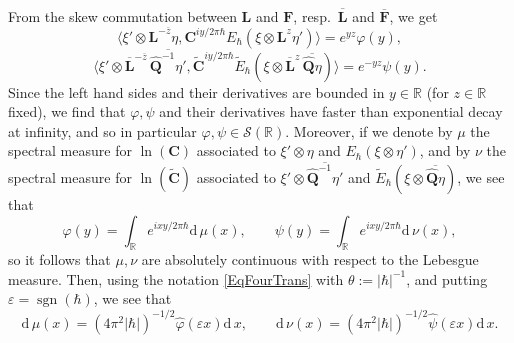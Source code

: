 \documentclass[11pt, reqno]{amsart}
\theoremstyle{definition}
\numberwithin{equation}{section}
\def\R{\mathbb R}
\def\sgn{\operatorname{sgn}}
\def\Sc{\mathcal S}
\newcommand{\Qb}{\mathbf{Q}}
\newcommand{\rd}{\mathrm{d}\!\,}
\newcommand{\Fb}{\mathbf{F}}
\newcommand{\Lb}{\mathbf{L}}
\newcommand{\Cb}{\mathbf{C}}
\begin{document}
From the skew commutation between $\Lb$ and $\Fb$, resp.\ $\overline{\Lb}$ and $\overline{\Fb}$, we get
\begin{equation}
\langle \xi' \otimes \Lb^{-\overline{z}}\eta,\Cb^{iy/2\pi \hbar}E_{\hbar}(\xi\otimes \Lb^{z}\eta')\rangle =e^{y z}\varphi(y),
\end{equation}
\begin{equation}\label{EqUnifExp}
\langle \xi'\otimes \overline{\Lb}^{-\overline{z}}\,\overline{\hat{\Qb}^{-1}\eta'},\widetilde{\Cb}^{iy/2\pi\hbar}\widetilde{E}_{\hbar}(\xi\otimes \overline{\Lb}^{z}\,\overline{\hat{\Qb}\eta})\rangle = e^{-y z}\psi(y).
\end{equation}
Since the left hand sides and their derivatives are bounded in $y\in \R$ (for $z\in \R$ fixed), we find that $\varphi,\psi$ and their derivatives have faster than exponential decay at infinity, and so in particular $\varphi,\psi\in\Sc(\R)$. Moreover, if we denote by $\mu$ the spectral measure for $\ln(\Cb)$ associated to $\xi'\otimes \eta$ and $E_{\hbar}(\xi\otimes \eta')$, and by $\nu$ the spectral measure for $\ln(\widetilde{\Cb})$ associated to $\xi'\otimes \overline{\hat{\Qb}^{-1}\eta'}$ and $\widetilde{E}_{\hbar}(\xi\otimes \overline{\hat{\Qb}\eta})$, we see that
\[
\varphi(y) = \int_{\R} e^{ixy/2\pi \hbar} \rd\mu(x),\qquad \psi(y) = \int_{\R}e^{ixy/2\pi\hbar} \rd\nu(x),
\]
so it follows that $\mu,\nu$ are absolutely continuous with respect to the Lebesgue measure. Then, using the notation \eqref{EqFourTrans} with $\theta := |\hbar|^{-1}$, and putting $\varepsilon = \sgn(\hbar)$, we see that
\begin{equation}\label{EqSpecMeasQD}
\rd \mu(x) = (4\pi^2 |\hbar|)^{-1/2}\hat{\varphi}(\varepsilon x)\rd x,\qquad \rd\nu(x) = (4\pi^2 |\hbar|)^{-1/2}\hat{\psi}(\varepsilon x)\rd x.
\end{equation}
\end{document}
